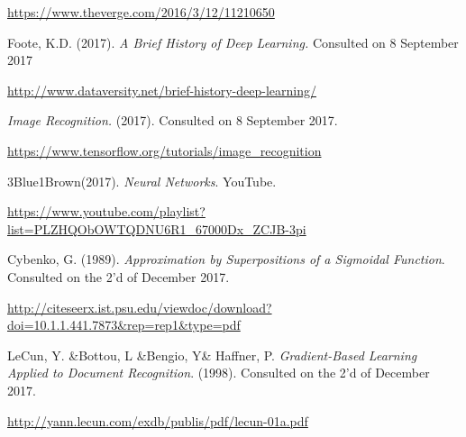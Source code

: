 \documentclass[12pt, titlepage]{article}
\begin{document}
\begin{thebibliography}{99}
        \url{https://www.theverge.com/2016/3/12/11210650}
        
        Foote, K.D. (2017). \textit{A Brief History of Deep Learning.} Consulted on 8 September 2017
        
        \href{http://www.dataversity.net/brief-history-deep-learning/}{http://www.dataversity.net/brief-history-deep-learning/}
        
        \textit{Image Recognition.} (2017). Consulted on 8 September 2017.
        
        \url{https://www.tensorflow.org/tutorials/image_recognition}
        
        3Blue1Brown(2017). \textit{Neural Networks}. YouTube.
        
        \url{https://www.youtube.com/playlist?list=PLZHQObOWTQDNU6R1_67000Dx_ZCJB-3pi}
        
        Cybenko, G. (1989). \textit{Approximation by Superpositions of a Sigmoidal Function}. Consulted on the 2'd of December 2017.
        
        \url{http://citeseerx.ist.psu.edu/viewdoc/download?doi=10.1.1.441.7873\&rep=rep1\&type=pdf}
        
        LeCun, Y. \&Bottou, L \&Bengio, Y\& Haffner, P. \textit{Gradient-Based Learning Applied to Document Recognition}. (1998). Consulted on the 2'd of December 2017.
        
        \url{http://yann.lecun.com/exdb/publis/pdf/lecun-01a.pdf}
    \end{thebibliography}
    
\end{document}
